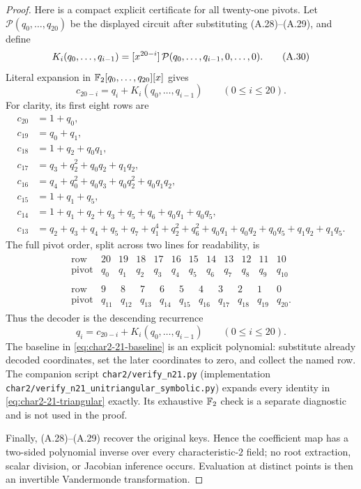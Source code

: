 \begin{proof}
Here is a compact explicit certificate for all twenty-one pivots.  Let
$\mathcal P(q_0,\ldots,q_{20})$ be the displayed circuit after substituting
(A.28)--(A.29), and define
\[
 K_i(q_0,\ldots,q_{i-1})
  =\coeff{\mathcal P(q_0,\ldots,q_{i-1},0,\ldots,0)}{20-i}.
                                                                    \tag{A.30}\label{eq:char2-21-baseline}
\]
Literal expansion in $\F_2[q_0,\ldots,q_{20}][x]$ gives
\[
 c_{20-i}=q_i+K_i(q_0,\ldots,q_{i-1})\qquad(0\le i\le20).       \tag{A.31}\label{eq:char2-21-triangular}
\]
For clarity, its first eight rows are
\[
\begin{aligned}
c_{20}&=1+q_0,\\
c_{19}&=q_0+q_1,\\
c_{18}&=1+q_2+q_0q_1,\\
c_{17}&=q_3+q_2^2+q_0q_2+q_1q_2,\\
c_{16}&=q_4+q_0^2+q_0q_3+q_0q_2^2+q_0q_1q_2,\\
c_{15}&=1+q_1+q_5,\\
c_{14}&=1+q_1+q_2+q_3+q_5+q_6+q_0q_1+q_0q_5,\\
c_{13}&=q_2+q_3+q_4+q_5+q_7+q_1^4+q_2^2+q_6^2
          +q_0q_1+q_0q_2+q_0q_5+q_1q_2+q_1q_5.
\end{aligned}                                                     \tag{A.32}
\]
The full pivot order, split across two lines for readability, is
\[
\begin{gathered}
\begin{array}{c|rrrrrrrrrrr}
\text{row}&20&19&18&17&16&15&14&13&12&11&10\\ \hline
\text{pivot}&q_0&q_1&q_2&q_3&q_4&q_5&q_6&q_7&q_8&q_9&q_{10}
\end{array}\\[1ex]
\begin{array}{c|rrrrrrrrrr}
\text{row}&9&8&7&6&5&4&3&2&1&0\\ \hline
\text{pivot}&q_{11}&q_{12}&q_{13}&q_{14}&q_{15}&q_{16}&q_{17}&q_{18}&q_{19}&q_{20}.
\end{array}
\end{gathered}                                                     \tag{A.33}
\]
Thus the decoder is the descending recurrence
\[
 q_i=c_{20-i}+K_i(q_0,\ldots,q_{i-1})\qquad(0\le i\le20).      \tag{A.34}
\]
The baseline in \eqref{eq:char2-21-baseline} is an explicit polynomial:
substitute already decoded coordinates, set the later coordinates to zero,
and collect the named row.  The companion script \texttt{char2/verify\_n21.py} (implementation
\texttt{char2/\allowbreak verify\_\allowbreak n21\_\allowbreak unitriangular\_\allowbreak symbolic.py}) expands every identity
in \eqref{eq:char2-21-triangular} exactly.  Its exhaustive $\F_2$ check is a
separate diagnostic and is not used in the proof.

Finally, (A.28)--(A.29) recover the original keys.  Hence the coefficient map
has a two-sided polynomial inverse over every characteristic-$2$ field; no
root extraction, scalar division, or Jacobian inference occurs.  Evaluation
at distinct points is then an invertible Vandermonde transformation.
\end{proof}

